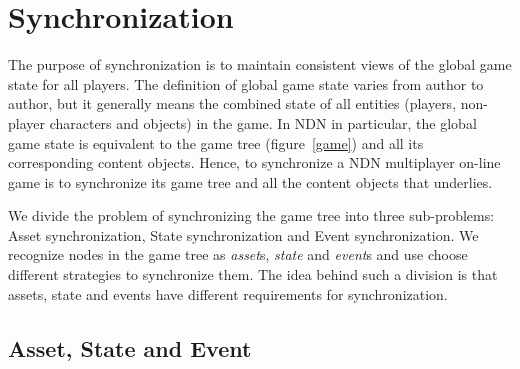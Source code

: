 \chapter{Synchronization}

\label{sync}

The purpose of synchronization is to maintain consistent views of the global game state for all players. The definition of global game state varies from author to author, but it generally means the combined state of all entities (players, non-player characters and objects) in the game. In NDN in particular, the global game state is equivalent to the game tree (figure~\ref{game}) and all its corresponding content objects. Hence, to synchronize a NDN multiplayer on-line game is to synchronize its game tree and all the content objects that underlies.

We divide the problem of synchronizing the game tree into three sub-problems: Asset synchronization, State synchronization and Event synchronization. We recognize nodes in the game tree as \emph{asset}s, \emph{state} and \emph{event}s and use choose different strategies to synchronize them. The idea behind such a division is that assets, state and events have different requirements for synchronization.

\section{Asset, State and Event}
\label{ase}

